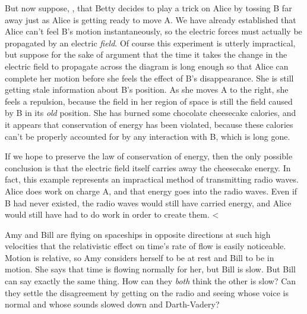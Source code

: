 But now suppose, , that Betty decides to play a trick on Alice
by tossing B far away just as Alice is getting ready to move A.
We have already established that Alice can't feel B's motion instantaneously, so the electric forces
must actually be propagated by an electric \emph{field}. Of course this experiment is
utterly impractical, but suppose for the sake of argument that the time it takes the change in the electric field
to propagate across the diagram is long enough so that Alice can complete her motion before she feels the
effect of B's disappearance. She is still getting stale information about B's position. As she moves A to the
right, she feels a repulsion, because the field in her region of space is still the field caused by
B in its \emph{old} position. She has burned some chocolate cheesecake calories, and it appears that
conservation of energy has been violated, because these calories can't be properly accounted for
by any interaction with B, which is long gone.

If we hope to preserve the law of conservation of energy, then the only possible conclusion is that
the electric field itself carries away the cheesecake energy. In fact, this example
represents an impractical method of transmitting radio waves. Alice does work on charge A, and that energy
goes into the radio waves. Even if B had never existed, the radio waves would still have carried energy,
and Alice would still have had to do work in order to create them.
<%

\startdqs

\begin{dq}
Amy and Bill are flying on spaceships in opposite directions at such high velocities that
the relativistic effect on time's rate of flow is easily noticeable.
Motion is relative, so Amy considers herself to be at rest and Bill to be in motion. She says that
time is flowing normally for her, but Bill is slow. But Bill can say exactly the same thing.
How can they \emph{both} think the other is slow? Can they settle the disagreement by getting
on the radio and seeing whose voice is normal and whose sounds slowed down and Darth-Vadery?
\end{dq}

